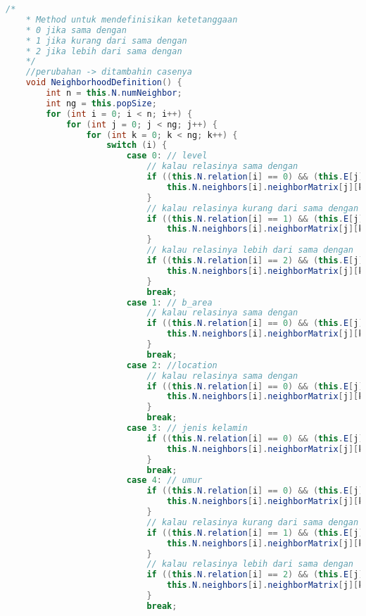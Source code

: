 \begin{lstlisting}[language=Java, caption=CA.java]
    /*
    * Method untuk mendefinisikan ketetanggaan
    * 0 jika sama dengan
    * 1 jika kurang dari sama dengan
    * 2 jika lebih dari sama dengan
    */
    //perubahan -> ditambahin casenya
    void NeighborhoodDefinition() {
        int n = this.N.numNeighbor;
        int ng = this.popSize;
        for (int i = 0; i < n; i++) {
            for (int j = 0; j < ng; j++) {
                for (int k = 0; k < ng; k++) {
                    switch (i) {
                        case 0: // level
                            // kalau relasinya sama dengan
                            if ((this.N.relation[i] == 0) && (this.E[j].level == this.E[k].level)) {
                                this.N.neighbors[i].neighborMatrix[j][k] = 1.0;
                            }
                            // kalau relasinya kurang dari sama dengan
                            if ((this.N.relation[i] == 1) && (this.E[j].level <= this.E[k].level)) {
                                this.N.neighbors[i].neighborMatrix[j][k] = 1.0;
                            }
                            // kalau relasinya lebih dari sama dengan
                            if ((this.N.relation[i] == 2) && (this.E[j].level >= this.E[k].level)) {
                                this.N.neighbors[i].neighborMatrix[j][k] = 1.0;
                            }
                            break;
                        case 1: // b_area
                            // kalau relasinya sama dengan
                            if ((this.N.relation[i] == 0) && (this.E[j].b_category == this.E[k].b_category) && (this.E[j].b_area == this.E[k].b_area)) {
                                this.N.neighbors[i].neighborMatrix[j][k] = 1.0;
                            }
                            break;
                        case 2: //location
                            // kalau relasinya sama dengan
                            if ((this.N.relation[i] == 0) && (this.E[j].location == this.E[k].location)) {
                                this.N.neighbors[i].neighborMatrix[j][k] = 1.0;
                            }
                            break;
                        case 3: // jenis kelamin
                            if ((this.N.relation[i] == 0) && (this.E[j].sex == this.E[k].sex)) {
                                this.N.neighbors[i].neighborMatrix[j][k] = 1.0;
                            }
                            break;
                        case 4: // umur
                            if ((this.N.relation[i] == 0) && (this.E[j].age == this.E[k].age)) {
                                this.N.neighbors[i].neighborMatrix[j][k] = 1.0;
                            }
                            // kalau relasinya kurang dari sama dengan
                            if ((this.N.relation[i] == 1) && (this.E[j].age <= this.E[k].age)) {
                                this.N.neighbors[i].neighborMatrix[j][k] = 1.0;
                            }
                            // kalau relasinya lebih dari sama dengan
                            if ((this.N.relation[i] == 2) && (this.E[j].age >= this.E[k].age)) {
                                this.N.neighbors[i].neighborMatrix[j][k] = 1.0;
                            }
                            break;


\end{lstlisting}
